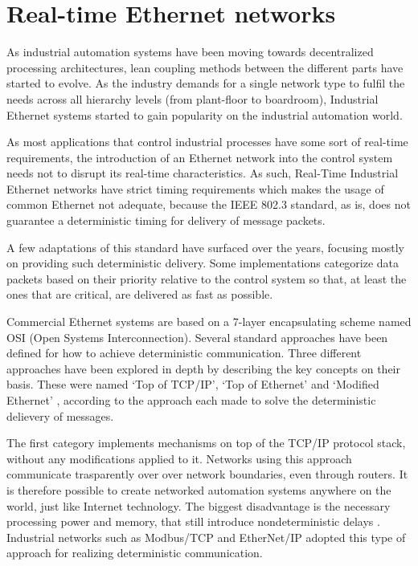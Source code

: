 \section{Real-time Ethernet networks}\label{sec:rt-networks}

As industrial automation systems have been moving towards decentralized processing architectures, lean coupling methods between the different parts have started to evolve.
As the industry demands for a single network type to fulfil the needs across all hierarchy levels (from plant-floor to boardroom), Industrial Ethernet systems started to gain popularity on the industrial automation world.

As most applications that control industrial processes have some sort of real-time requirements, the introduction of an Ethernet network into the control system needs not to disrupt its real-time characteristics.
As such, Real-Time Industrial Ethernet networks have strict timing requirements which makes the usage of common Ethernet not adequate, because the IEEE 802.3 standard, as is, does not guarantee a deterministic timing for delivery of message packets.

A few adaptations of this standard have surfaced over the years, focusing mostly on providing such deterministic delivery.
Some implementations categorize data packets based on their priority relative to the control system so that, at least the ones that are critical, are delivered as fast as possible.

Commercial Ethernet systems are based on a 7-layer encapsulating scheme named OSI (Open Systems Interconnection).
Several standard approaches have been defined for how to achieve deterministic communication.
Three different approaches have been explored in depth by describing the key concepts on their basis.
These were named `Top of TCP/IP', `Top of Ethernet' and `Modified Ethernet' \cite{rte:rte-for-automation}, according to the approach each made to solve the deterministic delievery of messages.

The first category implements mechanisms on top of the TCP/IP protocol stack, without any modifications applied to it.
Networks using this approach communicate trasparently over over network boundaries, even through routers.
It is therefore possible to create networked automation systems anywhere on the world, just like Internet technology.
The biggest disadvantage is the necessary processing power and memory, that still introduce nondeterministic delays \cite{rte:rte-for-automation}.
Industrial networks such as Modbus/TCP and EtherNet/IP \cite{protocol:ethernetip} adopted this type of approach for realizing deterministic communication.

